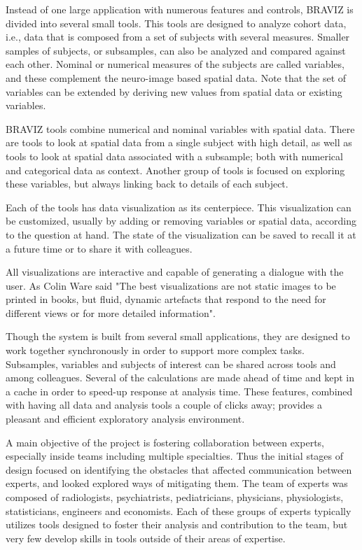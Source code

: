\documentclass[utf8]{frontiersSCNS} %
\begin{document}
Instead of one large application with numerous features and controls, BRAVIZ is divided into several small tools. This tools are designed to analyze cohort data, i.e., data that is composed from a set of subjects with several measures. Smaller samples of subjects, or subsamples, can also be analyzed and compared against each other. Nominal or numerical measures of the subjects are called variables, and these complement the neuro-image based spatial data. Note that the set of variables can be extended by deriving new values from spatial data or existing variables. 

BRAVIZ tools combine numerical and nominal variables with spatial data. There are tools to look at spatial data from a single subject with high detail, as well as tools to look at spatial data associated with a subsample; both with numerical and categorical data as context. Another group of tools is focused on exploring these variables, but always linking back to details of each subject.

Each of the tools has data visualization as its centerpiece. This visualization can be customized, usually by adding or removing variables or spatial data, according to the question at hand. The state of the visualization can be saved  to recall it at a future time or to share it with colleagues. 

All visualizations are interactive and capable of generating a dialogue with the user.
As Colin Ware \citep{ware_information_2004} said "The best visualizations are not static images to be printed in books, but fluid, dynamic artefacts that respond to the need for different views or for more detailed information".  

Though the system is built from several small applications, they are designed to work together synchronously in order to support more complex tasks. Subsamples, variables and subjects of interest can be shared across tools and among colleagues. 
Several of the calculations are made ahead of time and kept in a cache in order to speed-up response at analysis time. These features, combined with having all data and analysis tools a couple of clicks away; provides a pleasant and efficient exploratory analysis environment. 

A main objective of the project is fostering collaboration between experts, especially inside teams including multiple specialties. Thus the initial stages of design focused on identifying the obstacles that affected communication between experts, and looked explored ways of mitigating them. The team of experts was composed of radiologists, psychiatrists, pediatricians, physicians, physiologists, statisticians, engineers and economists. Each of these groups of experts typically utilizes tools designed to foster their analysis and contribution to the team, but very few develop skills in tools outside of their areas of expertise.
\end{document}
